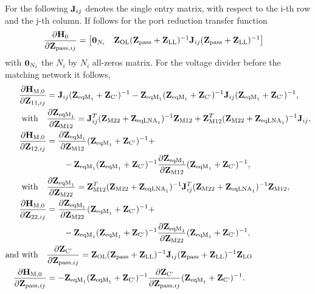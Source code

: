 For the following $\mathbf{J}_{ij}$ denotes the single entry matrix, with respect to the i-th row and the j-th column.
If follows for the port reduction transfer function
\begin{align}
\label{eq:H0_sig_grad}
\frac{\partial\mathbf{H}_{0}}{\partial\mathbf{Z}_{\text{pass},ij}}&=
\begin{bmatrix}
\mathbf{0}_{N_i} & \mathbf{Z}_\text{OL}(\mathbf{Z}_\text{pass}+\mathbf{Z}_\text{LL})^{-1}\mathbf{J}_{ij}(\mathbf{Z}_{\text{pass}}+\mathbf{Z}_\text{LL})^{-1}
\end{bmatrix}
\end{align}
with $\mathbf{0}_{N_i}$ the $N_i$ by $N_i$ all-zeros matrix.
For the voltage divider before the matching network it follows,
\begin{align}
\label{eq:HM0_sig_grad}
\frac{\partial\mathbf{H}_\text{M,0}}{\partial\mathbf{Z}_{11,ij}}&=
\mathbf{J}_{ij}(\mathbf{Z}_{\text{eqM}_1} + \mathbf{Z}_\text{C'})^{-1} - \mathbf{Z}_{\text{eqM}_1}(\mathbf{Z}_{\text{eqM}_1} + \mathbf{Z}_\text{C'})^{-1}\mathbf{J}_{ij}(\mathbf{Z}_{\text{eqM}_1} + \mathbf{Z}_\text{C'})^{-1},\\\nonumber
\text{with}\quad&\frac{\partial\mathbf{Z}_{\text{eqM}_1}}{\partial\mathbf{Z}_\text{M12}} = 
	\mathbf{J}_{ij}^T(\mathbf{Z}_\text{M22} + \mathbf{Z}_{\text{eqLNA}_1})^{-1}\mathbf{Z}_\text{M12} + 
	\mathbf{Z}_\text{M12}^T(\mathbf{Z}_\text{M22} + \mathbf{Z}_{\text{eqLNA}_1})^{-1}\mathbf{J}_{ij}, \\\nonumber
\frac{\partial\mathbf{H}_\text{M,0}}{\partial\mathbf{Z}_{12,ij}}&=
\frac{\partial\mathbf{Z}_{\text{eqM}_1}}{\partial\mathbf{Z}_\text{M12}}
	(\mathbf{Z}_{\text{eqM}_1} + \mathbf{Z}_\text{C'})^{-1} +\\
  &\qquad- \mathbf{Z}_{\text{eqM}_1}(\mathbf{Z}_{\text{eqM}_1} + \mathbf{Z}_\text{C'})^{-1}
	\frac{\partial\mathbf{Z}_{\text{eqM}_1}}{\partial\mathbf{Z}_\text{M12}}
	(\mathbf{Z}_{\text{eqM}_1} + \mathbf{Z}_\text{C'})^{-1},\\\nonumber
\text{with}\quad&\frac{\partial\mathbf{Z}_{\text{eqM}_1}}{\partial\mathbf{Z}_\text{M22}} = 
\mathbf{Z}_\text{M12}^T(\mathbf{Z}_\text{M22} + \mathbf{Z}_{\text{eqLNA}_1})^{-1}
	\mathbf{J}_{ij}^T(\mathbf{Z}_\text{M22} + \mathbf{Z}_{\text{eqLNA}_1})^{-1}\mathbf{Z}_\text{M12},\\\nonumber
\frac{\partial\mathbf{H}_\text{M,0}}{\partial\mathbf{Z}_{22,ij}}&=
\frac{\partial\mathbf{Z}_{\text{eqM}_1}}{\partial\mathbf{Z}_\text{M22}}
	(\mathbf{Z}_{\text{eqM}_1} + \mathbf{Z}_\text{C'})^{-1} +\\
  &\qquad -\mathbf{Z}_{\text{eqM}_1}(\mathbf{Z}_{\text{eqM}_1} + \mathbf{Z}_\text{C'})^{-1}
	\frac{\partial\mathbf{Z}_{\text{eqM}_1}}{\partial\mathbf{Z}_\text{M22}}
	(\mathbf{Z}_{\text{eqM}_1} + \mathbf{Z}_\text{C'})^{-1},\\\nonumber
\text{and with}\quad&\frac{\partial\mathbf{Z}_\text{C'}}{\partial\mathbf{Z}_{\text{pass},ij}} = 
\mathbf{Z}_\text{OL}(\mathbf{Z}_{\text{pass}}+\mathbf{Z}_\text{LL})^{-1}\mathbf{J}_{ij}(\mathbf{Z}_{\text{pass}}+\mathbf{Z}_\text{LL})^{-1}\mathbf{Z}_\text{LO}\\
\frac{\partial\mathbf{H}_\text{M,0}}{\partial\mathbf{Z}_{\text{pass},ij}}&=
-\mathbf{Z}_{\text{eqM}_1}(\mathbf{Z}_{\text{eqM}_1} + \mathbf{Z}_\text{C'})^{-1}\frac{\partial\mathbf{Z}_\text{C'}}{\partial\mathbf{Z}_{\text{pass},ij}}(\mathbf{Z}_{\text{eqM}_1} + \mathbf{Z}_\text{C'})^{-1}.
\end{align}
